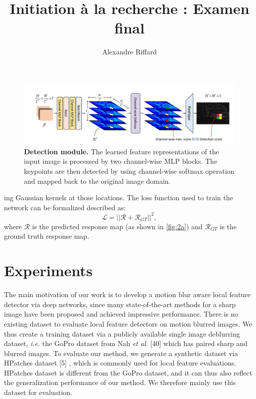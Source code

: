 \documentclass[10pt,twocolumn,letterpaper]{article}
\title{Initiation à la recherche : Examen final}
\author{Alexandre Riffard
}
\begin{document}
\maketitle
\nocite{*}


\begin{figure}
    \centering
    \includegraphics[width=17cm]{images/fig3.png}
    \caption{\textbf{Detection module.} The learned feature representations of the input image is processed by two channel-wise MLP blocks. The keypoints are then detected by using channel-wise softmax operation and mapped back to the original image domain.}
    \label{fig:Fig3}
\end{figure}

\noindent ing Gaussian kernels at those locations. The loss function used to train the network can be formalized described as:
\begin{equation}
        \mathcal{L} = ||\mathcal{R} + \mathcal{R}_{GT}||^2,
\end{equation}
where $\mathcal{R}$ is the predicted response map (as shown in \cref{fig:2a}) and $\mathcal{R}_{GT}$ is the ground truth response map.
\section{Experiments}
The main motivation of our work is to develop a motion blur aware local feature detector via deep networks, since many state-of-the-art methods for a sharp image have been proposed and achieved impressive performance. There is no existing dataset to evaluate local feature detectors on motion blurred images. We thus create a training dataset via a publicly available single image deblurring dataset, \textit{i.e.} the GoPro dataset from Nah \textit{et al.} [40] which has paired sharp and
blurred images. To evaluate our method, we generate a synthetic dataset via HPatches dataset [5] , which is commonly used for local feature evaluations. HPatches dataset is different from the GoPro dataset, and it can thus also reflect the generalization performance of our method. We therefore mainly use this dataset for evaluation.
\end{document}
